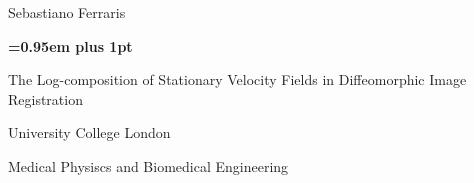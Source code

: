 \documentclass[a4paper,10pt]{book}
\theoremstyle{definition}
\begin{document}
\begin{titlepage}
%
\pagestyle{empty}
\begingroup
\vspace*{-7\topskip}

\vspace{-0.95 cm}

\begin{figure}[!h]
		\hspace{-2.5cm} %
\end{figure}
\vspace{1cm}

\begin{center}
	{\LARGE{Sebastiano Ferraris}\par}
\end{center}
\vspace{1.8cm}
\begin{center}
        {\huge\bf \baselineskip=0.95em plus 1pt \expandafter{
        The Log-composition of Stationary Velocity Fields in Diffeomorphic Image Registration
        \par}}
\end{center}



\vspace{2.7cm}

\begin{center}
	\LARGE{\rm\expandafter{University College London}}\par
	\expandafter{\Large{Medical Physiscs and Biomedical Engineering}\par}
\end{center}


\end{titlepage}
\end{document}
